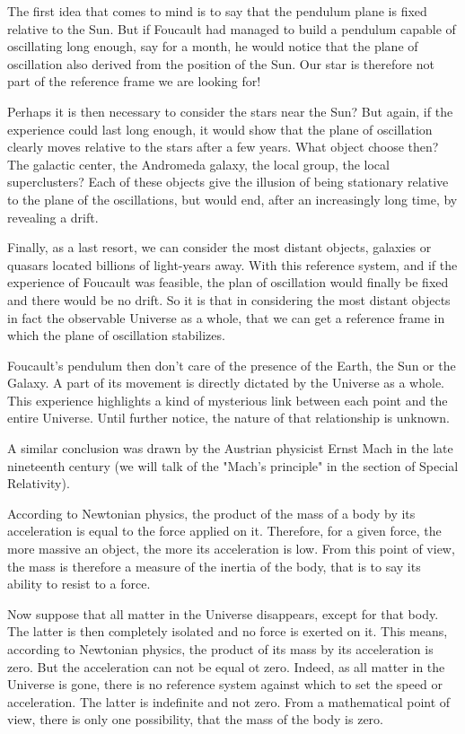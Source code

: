 	The first idea that comes to mind is to say that the pendulum plane is fixed relative to the Sun. But if Foucault had managed to build a pendulum capable of oscillating long enough, say for a month, he would notice that the plane of oscillation also derived from the position of the Sun. Our star is therefore not part of the reference frame we are looking for!

	Perhaps it is then necessary to consider the stars near the Sun? But again, if the experience could last long enough, it would show that the plane of oscillation clearly moves relative to the stars after a few years. What object choose then? The galactic center, the Andromeda galaxy, the local group, the local superclusters? Each of these objects give the illusion of being stationary relative to the plane of the oscillations, but would end, after an increasingly long time, by revealing a drift.

	Finally, as a last resort, we can consider the most distant objects, galaxies or quasars located billions of light-years away. With this reference system, and if the experience of Foucault was feasible, the plan of oscillation would finally be fixed and there would be no drift. So it is that in considering the most distant objects in fact the observable Universe as a whole, that we can get a reference frame in which the plane of oscillation stabilizes.
	
	Foucault's pendulum then don't care of the presence of the Earth, the Sun or the Galaxy. A part of its movement is directly dictated by the Universe as a whole. This experience highlights a kind of mysterious link between each point and the entire Universe. Until further notice, the nature of that relationship is unknown.

	A similar conclusion was drawn by the Austrian physicist Ernst Mach in the late nineteenth century (we will talk of the "Mach's principle" in the section of Special Relativity).

	According to Newtonian physics, the product of the mass of a body by its acceleration is equal to the force applied on it. Therefore, for a given force, the more massive an object, the more its acceleration is low. From this point of view, the mass is therefore a measure of the inertia of the body, that is to say its ability to resist to a force.
	
	Now suppose that all matter in the Universe disappears, except for that body. The latter is then completely isolated and no force is exerted on it. This means, according to Newtonian physics, the product of its mass by its acceleration is zero. But the acceleration can not be equal ot zero. Indeed, as all matter in the Universe is gone, there is no reference system against which to set the speed or acceleration. The latter is indefinite and not zero. From a mathematical point of view, there is only one possibility, that the mass of the body is zero.

